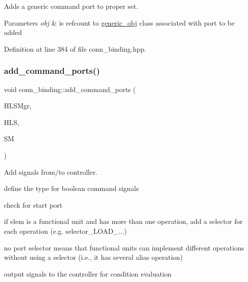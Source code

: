 Adds a generic command port to proper set. 


\begin{DoxyParams}{Parameters}
{\em obj} & is refcount to \hyperlink{classgeneric__obj}{generic\+\_\+obj} class associated with port to be added \\
\hline
\end{DoxyParams}


Definition at line 384 of file conn\+\_\+binding.\+hpp.

\mbox{\label{classconn__binding_abad9d4010da617d55dd3ba1a1eaf3bf1}} 
\subsubsection{\texorpdfstring{add\+\_\+command\+\_\+ports()}{add\_command\_ports()}}
{\footnotesize\ttfamily void conn\+\_\+binding\+::add\+\_\+command\+\_\+ports (\begin{DoxyParamCaption}\item[{const \hyperlink{hls__manager_8hpp_acd3842b8589fe52c08fc0b2fcc813bfe}{H\+L\+S\+\_\+manager\+Ref}}]{H\+L\+S\+Mgr,  }\item[{const \hyperlink{hls_8hpp_a75d0c73923d0ddfa28c4843a802c73a7}{hls\+Ref}}]{H\+LS,  }\item[{const \hyperlink{structural__manager_8hpp_ab3136f0e785d8535f8d252a7b53db5b5}{structural\+\_\+manager\+Ref}}]{SM }\end{DoxyParamCaption})\hspace{0.3cm}{\ttfamily [protected]}}



Add signals from/to controller. 

define the type for boolean command signals

check for start port

if elem is a functional unit and has more than one operation, add a selector for each operation (e.\+g. selector\+\_\+\+L\+O\+A\+D\+\_...)

no port selector means that functional units can implement different operations without using a selector (i.\+e., it has several alias operation)

output signals to the controller for condition evaluation 

